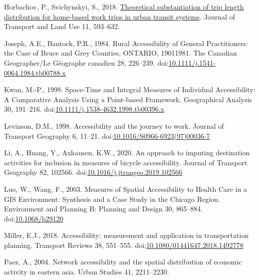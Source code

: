 \documentclass[]{elsarticle} %
\newlength{\cslhangindent}
\newlength{\cslentryspacingunit} %
\newenvironment{CSLReferences}[2] %
 {%
  \setlength{\parindent}{0pt}
  \ifodd #1
  \let\oldpar\par
  \def\par{\hangindent=\cslhangindent\oldpar}
  \fi
  \setlength{\parskip}{#2\cslentryspacingunit}
 }%
 {}
\begin{document}
\begin{CSLReferences}{1}{0}
\leavevmode{}%
Horbachov, P., Svichynskyi, S., 2018.
\href{https://www.jstor.org/stable/26622420}{Theoretical substantiation
of trip length distribution for home-based work trips in urban transit
systems}. Journal of Transport and Land Use 11, 593--632.

\leavevmode{}%
Joseph, A.E., Bantock, P.R., 1984. Rural Accessibility of General
Practitioners: the Case of Bruce and Grey Counties, ONTARIO,
1901{\textendash}1981. The Canadian Geographer/Le Géographe canadien 28,
226--239.
doi:\href{https://doi.org/10.1111/j.1541-0064.1984.tb00788.x}{10.1111/j.1541-0064.1984.tb00788.x}

\leavevmode{}%
Kwan, M.-P., 1998. Space-{Time} and {Integral} {Measures} of
{Individual} {Accessibility}: {A} {Comparative} {Analysis} {Using} a
{Point}-based {Framework}. Geographical Analysis 30, 191--216.
doi:\href{https://doi.org/10.1111/j.1538-4632.1998.tb00396.x}{10.1111/j.1538-4632.1998.tb00396.x}

\leavevmode{}%
Levinson, D.M., 1998. Accessibility and the journey to work. Journal of
Transport Geography 6, 11--21.
doi:\href{https://doi.org/10.1016/S0966-6923(97)00036-7}{10.1016/S0966-6923(97)00036-7}

\leavevmode{}%
Li, A., Huang, Y., Axhausen, K.W., 2020. An approach to imputing
destination activities for inclusion in measures of bicycle
accessibility. Journal of Transport Geography 82, 102566.
doi:\href{https://doi.org/10.1016/j.jtrangeo.2019.102566}{10.1016/j.jtrangeo.2019.102566}

\leavevmode{}%
Luo, W., Wang, F., 2003. Measures of Spatial Accessibility to Health
Care in a GIS Environment: Synthesis and a Case Study in the Chicago
Region. Environment and Planning B: Planning and Design 30, 865--884.
doi:\href{https://doi.org/10.1068/b29120}{10.1068/b29120}

\leavevmode{}%
Miller, E.J., 2018. Accessibility: measurement and application in
transportation planning. Transport Reviews 38, 551--555.
doi:\href{https://doi.org/10.1080/01441647.2018.1492778}{10.1080/01441647.2018.1492778}

\leavevmode{}%
Paez, A., 2004. Network accessibility and the spatial distribution of
economic activity in eastern asia. Urban Studies 41, 2211--2230.


\end{CSLReferences}
\end{document}
